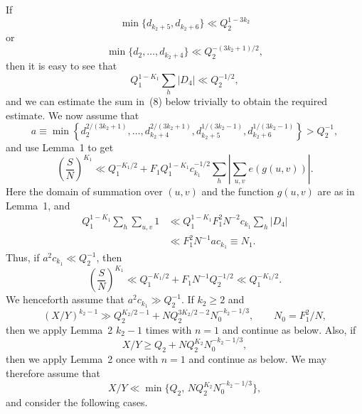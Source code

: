 \documentclass[10pt]{article}
\begin{document}
If
\[
  \min\{d_{k_2+5},d_{k_2+6}\}\ll Q_2^{1-3k_2}
\]
or
\[
  \min\{d_2,\ldots,d_{k_2+4}\}\ll Q_2^{-(3k_2+1)/2},
\]
then it is easy to see that
\[
  Q_1^{1-K_1}\sum_h |D_4|\ll Q_2^{-1/2},
\]
and we can estimate the sum in~(8) below trivially to obtain the required estimate. We now assume that
\[
  a\equiv\min\left\{
    d_2^{2/(3k_2+1)},\ldots,d_{k_2+4}^{2/(3k_2+1)},
    d_{k_2+5}^{1/(3k_2-1)},d_{k_2+6}^{1/(3k_2-1)}
  \right\}>Q_2^{-1},
\]
and use Lemma~1 to get
\begin{equation}
  \left(\frac SN\right)^{K_1}
  \ll Q_1^{-K_1/2}
  +F_1Q_1^{1-K_1}c_{k_1}^{-1/2}
   \sum_h\left|\sum_{u,v}e(g(u,v))\right|.
  \tag{8}
\end{equation}
Here the domain of summation over $(u,v)$ and the function $g(u,v)$ are as in Lemma~1, and
\[
\begin{aligned}
  Q_1^{1-K_1}\sum_h\sum_{u,v}1
  &\ll Q_1^{1-K_1}F_1^2N^{-2}c_{k_1}\sum_h|D_4|\\
  &\ll F_1^2N^{-1}ac_{k_1}\equiv N_1.
\end{aligned}
\]
Thus, if $a^2c_{k_1}\ll Q_2^{-1}$, then
\[
  \left(\frac SN\right)^{K_1}
  \ll Q_1^{-K_1/2}+F_1N^{-1}Q_2^{-1/2}
  \ll Q_1^{-K_1/2}.
\]
We henceforth assume that $a^2c_{k_1}\gg Q_2^{-1}$. If $k_2\geqslant2$ and
\[
  (X/Y)^{k_2-1}
  \gg Q_2^{K_2/2-1}+NQ_2^{3K_2/2-2}N_0^{-k_2-1/3},
  \qquad N_0=F_1^2/N,
\]
then we apply Lemma~2 $k_2-1$ times with $n=1$ and continue as below. Also, if
\[
  X/Y\geqslant Q_2+NQ_2^{K_2}N_0^{-k_2-1/3},
\]
then we apply Lemma~2 once with $n=1$ and continue as below. We may therefore assume that
\[
  X/Y\ll\min\{Q_2,\,NQ_2^{K_2}N_0^{-k_2-1/3}\},
\]
and consider the following cases.
\end{document}
